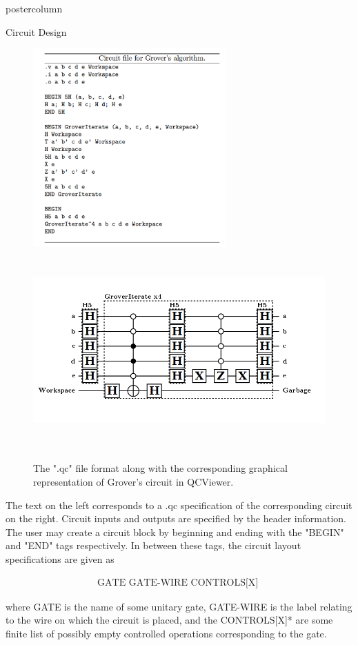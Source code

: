 \documentclass[final]{beamer} %
\begin{document}
\begin{frame}{}
\begin{columns}
\begin{column}{.33\textwidth}
\begin{beamercolorbox}[center,wd=\textwidth]{postercolumn}
\begin{minipage}[T]{.95\textwidth}
\begin{block}{\large Circuit Design}
             \centering 
		\begin{figure}[!htbp]
		  \centering
		  \includegraphics[height=3in]{figures/Grover_Text.PNG} \ \ \ \  \includegraphics[height=3in]{figures/Grover_Circuit.PNG}
		  \caption{The ".qc" file format along with the corresponding graphical representation of Grover's circuit in QCViewer.}
		\end{figure}

The text on the left corresponds to a .qc specification of the corresponding circuit on the right. Circuit inputs and outputs are specified by the header information. The user may create a circuit block by beginning and ending with the "BEGIN" and "END" tags respectively. In between these tags, the circuit layout specifications are given as

\begin{align*}
\text{GATE \ GATE-WIRE \ CONTROLS[X] }
\end{align*}

where GATE is the name of some unitary gate, GATE-WIRE is the label relating to the wire on which the circuit is placed, and the CONTROLS[X]* are some finite list of possibly empty controlled operations corresponding to the gate.


\end{block}
\end{minipage}
\end{beamercolorbox}
\end{column}
\end{columns}
\end{frame}
\end{document}
